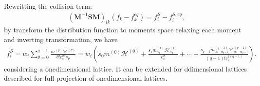 \documentclass[letterpaper,10pt,english,openany,oneside]{jupyterBook}
\begin{document}
\sphinxAtStartPar
Rewritting the collision term:
\begin{equation*}
\begin{split}
(\textbf{M}^{-1}\textbf{S}\textbf{M})_{ik}\left( f_{k} - f_{k}^{eq}  \right) = f_{i}^{S} - f_{i}^{S,eq}, 
\end{split}
\end{equation*}
\sphinxAtStartPar
by transform the distribution function to moments space relaxing each moment and inverting transformation, we have
\begin{equation*}
\begin{split}
f_{i}^{S} = w_{i}\displaystyle\sum_{\theta=0}^{q-1}\frac{m^{(\theta)}\mathcal{H}^{(\theta)}}{\theta!c_{s}^{2\theta}s_{\theta}}=w_{i}\left( s_{0} m^{(0)}\mathcal{H}^{(0)} + \frac{s_{1}m^{(1)}_{\alpha_{1}}\mathcal{H}^{(1)}_{\alpha_{1}}}{c_{s}^{2}} + \cdots + \frac{s_{q-1}m^{(q-1)}_{\alpha_{1}\cdots \alpha_{q-1}}\mathcal{H}^{(q-1)}_{\alpha_{1}\cdots \alpha_{q-1}}}{(q-1)!c_{s}^{2(q-1)}} \right).
\end{split}
\end{equation*}
\sphinxAtStartPar
considering a one\sphinxhyphen{}dimensional lattice. It can be extended for d\sphinxhyphen{}dimensional lattices described for full projection of one\sphinxhyphen{}dimensional lattices.
\end{document}
